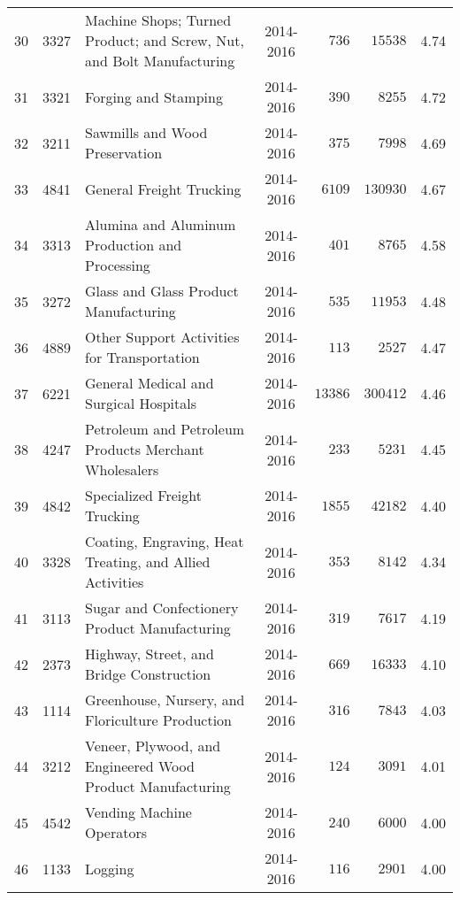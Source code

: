 \documentclass[9pt, oneside]{article}   	%
\begin{document}
\begin{longtable}{lcp{3in}cccc}
30  & 3327 & Machine Shops; Turned Product; and Screw, Nut, and Bolt Manufacturing & 2014-2016 & $\phantom{00}736$ & $\phantom{0}15538$ &  4.74 \\
31  & 3321 & Forging and Stamping & 2014-2016 & $\phantom{00}390$ & $\phantom{00}8255$ &  4.72 \\
32  & 3211 & Sawmills and Wood Preservation & 2014-2016 & $\phantom{00}375$ & $\phantom{00}7998$ &  4.69 \\
33  & 4841 & General Freight Trucking & 2014-2016 & $\phantom{0}6109$ & $130930$ &  4.67 \\
34  & 3313 & Alumina and Aluminum Production and Processing & 2014-2016 & $\phantom{00}401$ & $\phantom{00}8765$ &  4.58 \\
35  & 3272 & Glass and Glass Product Manufacturing & 2014-2016 & $\phantom{00}535$ & $\phantom{0}11953$ &  4.48 \\
36  & 4889 & Other Support Activities for Transportation & 2014-2016 & $\phantom{00}113$ & $\phantom{00}2527$ &  4.47 \\
37  & 6221 & General Medical and Surgical Hospitals & 2014-2016 & $13386$ & $300412$ &  4.46 \\
38  & 4247 & Petroleum and Petroleum Products Merchant Wholesalers & 2014-2016 & $\phantom{00}233$ & $\phantom{00}5231$ &  4.45 \\
39  & 4842 & Specialized Freight Trucking & 2014-2016 & $\phantom{0}1855$ & $\phantom{0}42182$ &  4.40 \\
40  & 3328 & Coating, Engraving, Heat Treating, and Allied Activities & 2014-2016 & $\phantom{00}353$ & $\phantom{00}8142$ &  4.34 \\
41  & 3113 & Sugar and Confectionery Product Manufacturing & 2014-2016 & $\phantom{00}319$ & $\phantom{00}7617$ &  4.19 \\
42  & 2373 & Highway, Street, and Bridge Construction & 2014-2016 & $\phantom{00}669$ & $\phantom{0}16333$ &  4.10 \\
43  & 1114 & Greenhouse, Nursery, and Floriculture Production & 2014-2016 & $\phantom{00}316$ & $\phantom{00}7843$ &  4.03 \\
44  & 3212 & Veneer, Plywood, and Engineered Wood Product Manufacturing & 2014-2016 & $\phantom{00}124$ & $\phantom{00}3091$ &  4.01 \\
45  & 4542 & Vending Machine Operators & 2014-2016 & $\phantom{00}240$ & $\phantom{00}6000$ &  4.00 \\
46  & 1133 & Logging & 2014-2016 & $\phantom{00}116$ & $\phantom{00}2901$ &  4.00 \\

\end{longtable}
\end{document}
